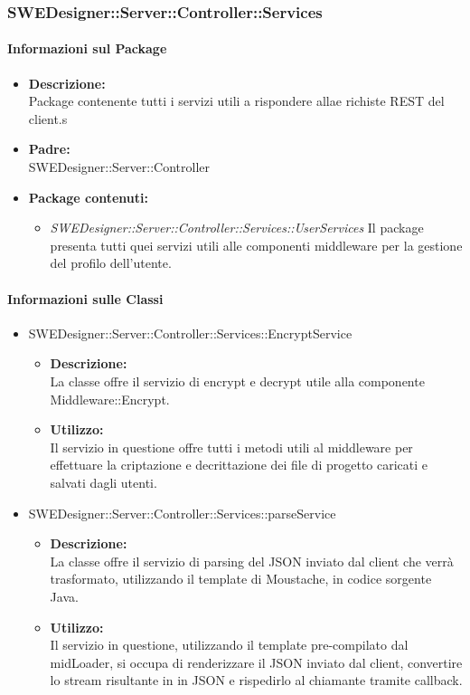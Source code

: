 		\subsubsection{SWEDesigner::Server::Controller::Services}
		\paragraph{Informazioni sul Package}
		\begin{itemize}
			\item \textbf{Descrizione: }\\
			Package contenente tutti i servizi utili a rispondere allae richiste REST del client.s
			\item \textbf{Padre: }\\ SWEDesigner::Server::Controller
			\item \textbf{Package contenuti: }
			\begin{itemize}
				\item \emph{SWEDesigner::Server::Controller::Services::UserServices}
				Il package presenta tutti quei servizi utili alle componenti middleware per la gestione del profilo dell'utente.
			\end{itemize}
		\end{itemize}
		\paragraph{Informazioni sulle Classi}
		\begin{itemize}
			\item SWEDesigner::Server::Controller::Services::EncryptService
			\begin{itemize}
				\item \textbf{Descrizione: }\\
				La classe offre il servizio di encrypt e decrypt utile alla componente Middleware::Encrypt.
				\item \textbf{Utilizzo: }\\
				Il servizio in questione offre tutti i metodi utili al middleware per effettuare la criptazione e decrittazione dei file di progetto caricati e salvati dagli utenti.
			\end{itemize}
			\item SWEDesigner::Server::Controller::Services::parseService
			\begin{itemize}
				\item \textbf{Descrizione: }\\
				La classe offre il servizio di parsing del JSON inviato dal client che verrà trasformato, utilizzando il template di Moustache, in codice sorgente Java.
				\item \textbf{Utilizzo: }\\
				Il servizio in questione, utilizzando il template pre-compilato dal midLoader, si occupa di renderizzare il JSON inviato dal client, convertire lo stream risultante in in JSON e rispedirlo al chiamante tramite callback.
			\end {itemize}
		\end{itemize}

